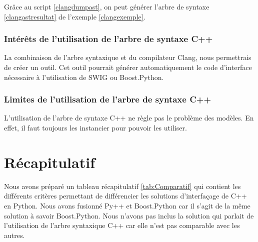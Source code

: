 \documentclass[11pt, french, screen]{report-rd-info}
\begin{document}




Grâce au script \ref{clangdumpast}, on peut générer l'arbre de syntaxe \ref{clangastresultat} de l'exemple \ref{clangexemple}.

\subsubsection{Intérêts de l'utilisation de l'arbre de syntaxe C++}

La combinaison de l'arbre syntaxique et du compilateur Clang, nous permettrais de créer un outil. Cet outil pourrait générer automatiquement le code d'interface nécessaire à l'utilisation de SWIG ou Boost.Python.

\subsubsection{Limites de l'utilisation de l'arbre de syntaxe C++}

L'utilisation de l'arbre de syntaxe C++ ne règle pas le problème des modèles. En effet, il faut toujours les instancier pour pouvoir les utiliser.

\section{Récapitulatif}

Nous avons préparé un tableau récapitulatif \ref{tab:Comparatif} qui contient les différents critères permettant de différencier les solutions d'interfaçage de C++ en Python. Nous avons fusionné Py++ et Boost.Python car il s'agit de la même solution à savoir Boost.Python. Nous n'avons pas inclus la solution qui parlait de l'utilisation de l'arbre syntaxique C++ car elle n'est pas comparable avec les autres.
\end{document}

